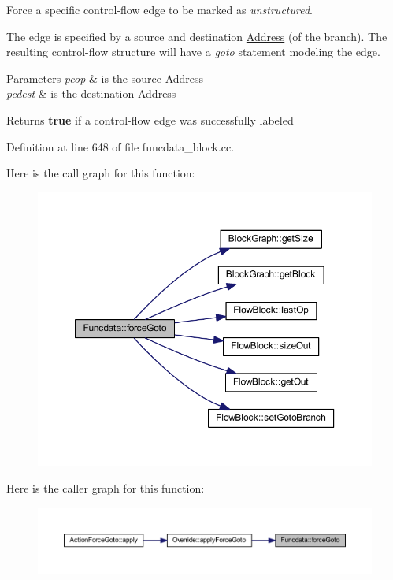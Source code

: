 Force a specific control-\/flow edge to be marked as {\itshape unstructured}. 

The edge is specified by a source and destination \mbox{\hyperlink{class_address}{Address}} (of the branch). The resulting control-\/flow structure will have a {\itshape goto} statement modeling the edge. 
\begin{DoxyParams}{Parameters}
{\em pcop} & is the source \mbox{\hyperlink{class_address}{Address}} \\
\hline
{\em pcdest} & is the destination \mbox{\hyperlink{class_address}{Address}} \\
\hline
\end{DoxyParams}
\begin{DoxyReturn}{Returns}
{\bfseries{true}} if a control-\/flow edge was successfully labeled 
\end{DoxyReturn}


Definition at line 648 of file funcdata\+\_\+block.\+cc.

Here is the call graph for this function\+:
\nopagebreak
\begin{figure}[H]
\begin{center}
\leavevmode
\includegraphics[width=350pt]{class_funcdata_ac9b35091642dc7527a537d01db5ad7e1_cgraph}
\end{center}
\end{figure}
Here is the caller graph for this function\+:
\nopagebreak
\begin{figure}[H]
\begin{center}
\leavevmode
\includegraphics[width=350pt]{class_funcdata_ac9b35091642dc7527a537d01db5ad7e1_icgraph}
\end{center}
\end{figure}
\mbox{\label{class_funcdata_a4a711cda20fb99632665753918c03a65}} 
